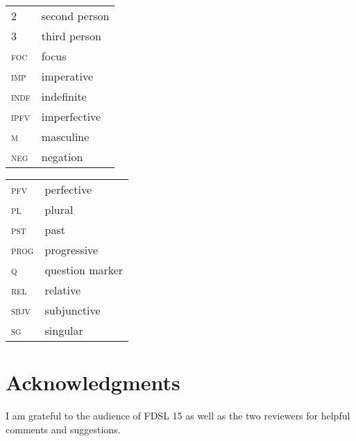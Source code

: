 \documentclass[output=paper,colorlinks,citecolor=brown]{langscibook}
\begin{document}
\begin{tabularx}{.5\textwidth}{@{}lQ}
\textsc{2}&second person\\
\textsc{3}&third person\\
\textsc{foc}&focus\\
\textsc{imp}&imperative\\
\textsc{indf}&indefinite\\
\textsc{ipfv}&imperfective\\
\textsc{m}&masculine\\
\textsc{neg}&negation\\
\end{tabularx}%
\begin{tabularx}{.5\textwidth}{lQ@{}}
\textsc{pfv}&perfective\\
\textsc{pl}&plural\\
\textsc{pst}&past\\
\textsc{prog}&progressive\\
\textsc{q}&question marker\\
\textsc{rel}&relative\\
\textsc{sbjv}&subjunctive\\
\textsc{sg}&singular\\

\end{tabularx}

\section*{Acknowledgments}
I am grateful to the audience of FDSL 15 as well as the two reviewers for helpful comments and suggestions.  

\printbibliography[heading=subbibliography,notkeyword=this]
\end{document}
